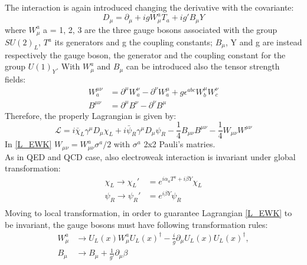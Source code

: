 The interaction is again introduced changing the derivative with the covariante:
\begin{equation}
D_{\mu} = \partial_{\mu} + igW_{\mu}^{a}T_{a} + ig'B_{\mu}Y
\label{D_EWK}
\end{equation}
where $W_{\mu}^{a}$ a = 1, 2, 3 are the three gauge bosons associated with the group $SU(2)_{L}$, $T^{a}$ its generators and g the coupling constants; $B_{\mu}$, Y and g are instead respectively the gauge boson, the generator and the coupling constant for the group $U(1)_{Y}$.
With $W_{\mu}^{a}$ and $B_{\mu}$ can be introduced also the tensor strength fields:
\begin{equation}
\begin{split}
W^{\mu\nu}_{a} &= \partial^{\mu}W^{\nu}_{a} - \partial^{\nu}W^{\mu}_{a} + g\epsilon^{abc}W^{\mu}_{b}W^{\nu}_{c} \\
B^{\mu\nu} 	 &= \partial^{\mu}B^{\nu} - \partial^{\nu}B^{\mu}
\label{WB_munu}
\end{split}
\end{equation}
Therefore, the properly Lagrangian is given by:
\begin{equation}
\mathcal{L} = i\bar{\chi}_{L}\gamma^{\mu}D_{\mu}\chi_{L} + i\bar{\psi}_{R}\gamma^{\mu}D_{\mu}\psi_{R} - \frac{1}{4}B_{\mu\nu}B^{\mu\nu} - \frac{1}{4}W_{\mu\nu}W^{\mu\nu}
\label{L_EWK}
\end{equation}
In \ref{L_EWK} $W_{\mu\nu} = W^{a}_{\mu\nu}\sigma^{a}/2$ with $\sigma^{a}$ 2x2 Pauli's matries. \\
As in QED and QCD case, also electroweak interaction is invariant under global transformation:
\begin{equation}
\begin{split}
\chi_{L} \to \chi_{L}' &= e^{i\alpha_{a} T^{a}  + i\beta Y} \chi_{L} \\
\psi_{R} \to \psi_{R}' &= e^{i\beta Y} \psi_{R} \\
\label{EWK_global}
\end{split}
\end{equation}
Moving to local transformation, in order to guarantee Lagrangian \ref{L_EWK} to be invariant, the gauge bosons must have following transformation rules:
\begin{equation}
\begin{split}
W^{a}_{\mu} &\to U_{L}(x) W^{a}_{\mu}  U_{L}(x)^{\dagger} - \frac{i}{g}\partial_{\mu}U_{L}(x) U_{L}(x)^{\dagger}, \\
B_{\mu} &\to B_{\mu} + \frac{1}{g'}\partial_{\mu}\beta
\label{EWK_global}
\end{split}
\end{equation}
